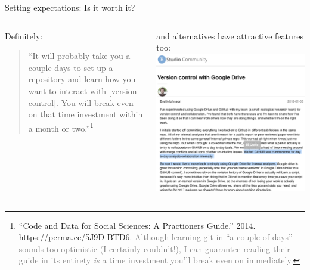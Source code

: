 \documentclass[ignorenonframetext, 10pt, aspectratio=169]{beamer}
\begin{document}
\begin{frame}{Setting expectations: Is it worth it?}

\renewcommand\thempfootnote{\fnsymbol{mpfootnote}}
\vspace{-0.3cm}
\begin{columns}[T]
\begin{column}{0.5\textwidth}
\begin{minipage}[t]{\linewidth}

Definitely:\\

\begin{quote}
``It will probably take you a couple days to set up a repository and learn how you want to interact with [version control]. You will break even on that time investment within a month or two.''\footnote[2]{\scriptsize ``Code and Data for Social Sciences: A Practioners Guide.'' 2014. \url{https://perma.cc/5J9D-BTD6}.  \textcolor{gray}{Although learning git in ``a couple of days'' sounds too optimistic (I certainly couldn't!), I can guarantee reading their guide in its entirety \emph{is} a time investment you'll break even on immediately.}}\\
\end{quote}

\end{minipage}
\bigskip
\bigskip
\vspace*{\fill}

\end{column}
\begin{column}{0.5\textwidth}
\begin{minipage}[t]{\linewidth}
and alternatives have attractive features too:
\smallskip
\centering
\includegraphics[width = 0.8\linewidth]{github_vs_gdrive.png}
\end{minipage}
\end{column}
\end{columns}
\end{frame}
\end{document}
